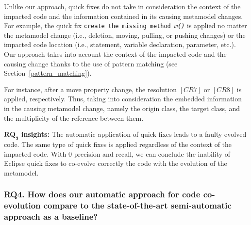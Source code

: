 	
	Unlike our approach, quick fixes do not take in consideration the context of the impacted code and the information contained in its causing metamodel changes. For example, the quick fix \texttt{create the missing method \emph{m()}} is applied no matter the metamodel change (i.e., deletion, moving, pulling, or pushing changes) or the impacted code location (i.e., statement, variable declaration, parameter, etc.). %
	Our approach takes into account the context of the impacted code and the causing change thanks to the use of pattern matching (see Section~\ref{pattern_matching}). 
	
	
	For instance, after a move property change, the resolution $[CR7]$ or $[CR8]$ is applied, respectively. Thus, taking into consideration the embedded information in the causing metamodel change, namely the origin class, the target class, and the multiplicity of the reference between them.
	
	
	
	\begin{tcolorbox}[boxsep=-2pt]
	\textbf{$\boldsymbol{RQ_3}$ insights:}
	The automatic application of quick fixes leads to a faulty evolved code. The same type of quick fixes is applied regardless of the context of the impacted code. With 0 precision and recall, we can conclude the inability of Eclipse quick fixes to co-evolve correctly the code with the evolution of the metamodel. 
	\red{}
	
	\end{tcolorbox}
	
	
	
	\subsubsection{RQ4. How does our automatic approach for code co-evolution compare to the state-of-the-art semi-automatic approach as a baseline?} 
	
